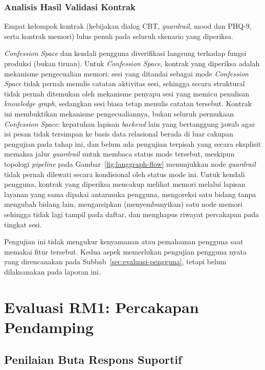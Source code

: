 \subsubsection{Analisis Hasil Validasi Kontrak}

Empat kelompok kontrak (kebijakan dialog CBT, \textit{guardrail}, mood dan PHQ-9, serta kontrak memori) lulus penuh pada seluruh skenario yang diperiksa.

\textit{Confession Space} dan kendali pengguna diverifikasi langsung terhadap fungsi produksi (bukan tiruan). Untuk \textit{Confession Space}, kontrak yang diperiksa adalah mekanisme pengecualian memori: sesi yang ditandai sebagai mode \textit{Confession Space} tidak pernah menulis catatan aktivitas sesi, sehingga secara struktural tidak pernah ditemukan oleh mekanisme penyapu sesi yang memicu penulisan \textit{knowledge graph}, sedangkan sesi biasa tetap menulis catatan tersebut. Kontrak ini membuktikan mekanisme pengecualiannya, bukan seluruh permukaan \textit{Confession Space}: kepatuhan lapisan \textit{backend} lain yang bertanggung jawab agar isi pesan tidak tersimpan ke basis data relasional berada di luar cakupan pengujian pada tahap ini, dan belum ada pengujian terpisah yang secara eksplisit memaksa jalur \textit{guardrail} untuk membaca status mode tersebut, meskipun topologi \textit{pipeline} pada Gambar~\ref{fig:langgraph-flow} menunjukkan node \textit{guardrail} tidak pernah dilewati secara kondisional oleh status mode ini. Untuk kendali pengguna, kontrak yang diperiksa mencakup melihat memori melalui lapisan layanan yang sama dipakai antarmuka pengguna, mengoreksi satu bidang tanpa mengubah bidang lain, mengarsipkan (menyembunyikan) satu node memori sehingga tidak lagi tampil pada daftar, dan menghapus riwayat percakapan pada tingkat sesi.

Pengujian ini tidak mengukur kenyamanan atau pemahaman pengguna saat memakai fitur tersebut. Kedua aspek memerlukan pengujian pengguna nyata yang direncanakan pada Subbab~\ref{sec:evaluasi-pengguna}, tetapi belum dilaksanakan pada laporan ini.

\section{Evaluasi RM1: Percakapan Pendamping}
\label{sec:evaluasi-komparatif}

\subsection{Penilaian Buta Respons Suportif}
\label{sec:v2-dialogue}

